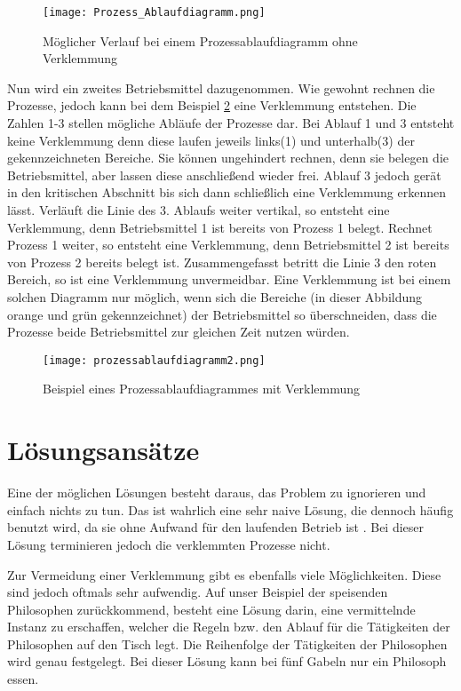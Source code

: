 \begin{figure}[H]
\caption{Möglicher Verlauf bei einem Prozessablaufdiagramm ohne Verklemmung}
\label{fig:normales_Ablaufdiagramm}
\centering
\texttt{[image: Prozess\_Ablaufdiagramm.png]}
\end{figure}

Nun wird ein zweites Betriebsmittel dazugenommen. Wie gewohnt rechnen die Prozesse, jedoch kann bei dem Beispiel \ref{fig:verklemmtes_ablaufdiagramm} eine Verklemmung entstehen. Die Zahlen 1-3 stellen mögliche Abläufe der Prozesse dar. Bei Ablauf 1 und 3 entsteht keine Verklemmung denn diese laufen jeweils links(1) und unterhalb(3) der gekennzeichneten Bereiche. Sie können ungehindert rechnen, denn sie belegen die Betriebsmittel, aber lassen diese anschließend wieder frei. Ablauf 3 jedoch gerät in den kritischen Abschnitt bis sich dann schließlich eine Verklemmung erkennen lässt. Verläuft die Linie des 3. Ablaufs weiter vertikal, so entsteht eine Verklemmung, denn Betriebsmittel 1 ist bereits von Prozess 1 belegt. Rechnet Prozess 1 weiter, so entsteht eine Verklemmung, denn Betriebsmittel 2 ist bereits von Prozess 2 bereits belegt ist. Zusammengefasst betritt die Linie 3 den roten Bereich, so ist eine Verklemmung unvermeidbar.
Eine Verklemmung ist bei einem solchen Diagramm nur möglich, wenn sich die Bereiche (in dieser Abbildung orange und grün gekennzeichnet) der Betriebsmittel so überschneiden, dass die Prozesse beide Betriebsmittel zur gleichen Zeit nutzen würden.

\begin{figure}[H]
\caption{Beispiel eines Prozessablaufdiagrammes mit Verklemmung}
\label{fig:verklemmtes_ablaufdiagramm}
\centering
\texttt{[image: prozessablaufdiagramm2.png]}
\end{figure}

\section{Lösungsansätze}
\label{sec:lösung}

Eine der möglichen Lösungen besteht daraus, das Problem zu ignorieren und einfach nichts zu tun. Das ist wahrlich eine sehr naive Lösung, die dennoch häufig benutzt wird, da sie ohne Aufwand für den laufenden Betrieb ist \parencite[vgl. ][S.79]{mandl2020} . Bei dieser Lösung terminieren jedoch die verklemmten Prozesse nicht.
 
Zur Vermeidung einer Verklemmung gibt es ebenfalls viele Möglichkeiten. Diese sind jedoch oftmals sehr  aufwendig. Auf unser Beispiel der speisenden Philosophen zurückkommend, besteht eine Lösung darin, eine vermittelnde Instanz zu erschaffen, welcher die Regeln bzw. den Ablauf für die Tätigkeiten der Philosophen auf den Tisch legt. Die Reihenfolge der Tätigkeiten der Philosophen wird genau festgelegt. Bei dieser Lösung kann bei fünf Gabeln nur ein Philosoph essen.\parencite[vgl.][S.220]{tanenbaum2016}

